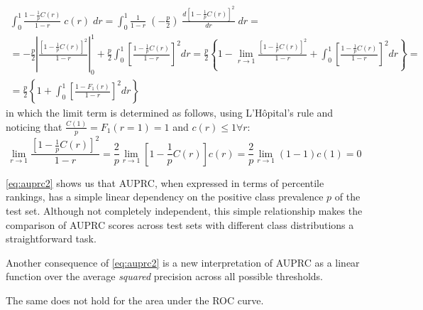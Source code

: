 \begin{multline}
    \int_{0}^{1}
        \frac{1 - \frac{1}{p}C(r)}{1 - r}
        \; c(r)
    \;dr
    = \int_{0}^{1}
        \frac{1}{1 - r}
        \; \left(-\frac{p}{2}\right)
        \; \frac{d [1 - \frac{1}{p}C(r)]^2}{dr}
    \;dr
    =\\
    =
    - \frac{p}{2}
    \left|
        \frac{[1 - \frac{1}{p}C(r)]^2}{1 - r}
    \right|_0^1
    + \frac{p}{2}
    \int_{0}^{1}
        \left[\frac{1 - \frac{1}{p}C(r)}{1 - r}\right]^2
    dr
    =
    \frac{p}{2} \left\{
        1 - \lim_{r \to 1} \frac{[1 - \frac{1}{p}C(r)]^2}{1 - r}
        + \int_{0}^{1}
            \left[\frac{1 - \frac{1}{p}C(r)}{1 - r}\right]^2
        dr
    \right\}
    =\\
    =
    \frac{p}{2}
    \left\{
        1 + \int_0^1 \left[\frac{1 - F_1(r)}{1 - r}\right]^2 dr
    \right\}
    \label{eq:auprc2}
\end{multline}
%
in which the limit term is determined as follows, using L'Hôpital's rule and noticing that $\frac{C(1)}{p}= F_1(r=1) = 1$ and $c(r) \le 1 \forall r$:
%
\begin{equation*}
    \lim_{r \to 1} \frac{[1 - \frac{1}{p}C(r)]^2}{1 - r}
    = \frac{2}{p} \lim_{r \to 1} \left[1 - \frac{1}{p}C(r)\right] c(r)
    = \frac{2}{p} \lim_{r \to 1} (1 - 1) c(1)
    = 0
\end{equation*}

\autoref{eq:auprc2} shows us that AUPRC, when expressed in terms of percentile rankings, has a simple linear dependency on the positive class prevalence $p$ of the test set. Although not completely independent, this simple relationship makes the comparison of AUPRC scores across test sets with different class distributions a straightforward task. %

Another consequence of \autoref{eq:auprc2} is a new interpretation of AUPRC as a linear function over the average \emph{squared} precision across all possible thresholds.


The same does not hold for the area under the ROC curve. 

